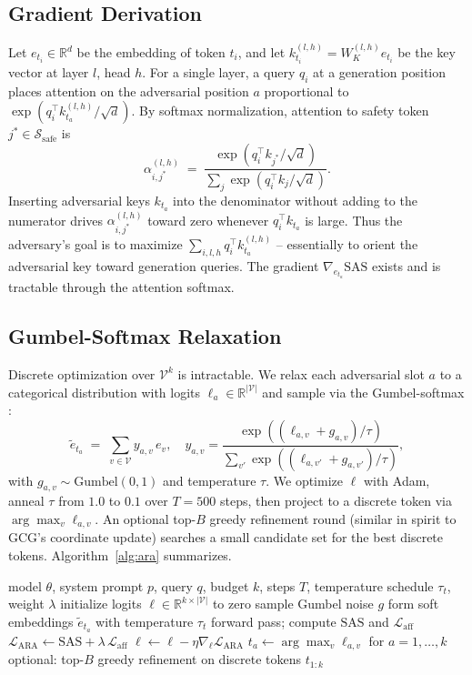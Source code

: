 \documentclass{article}
\theoremstyle{definition}
\theoremstyle{remark}
\newcommand{\SAS}{\mathrm{SAS}}
\newcommand{\R}{\mathbb{R}}
\begin{document}
\subsection{Gradient Derivation}

Let $e_{t_i} \in \R^d$ be the embedding of token $t_i$, and let $k^{(l,h)}_{t_i} = W_K^{(l,h)} e_{t_i}$ be the key vector at layer $l$, head $h$. For a single layer, a query $q_i$ at a generation position places attention on the adversarial position $a$ proportional to $\exp(q_i^\top k^{(l,h)}_{t_a}/\sqrt{d})$. By softmax normalization, attention to safety token $j^* \in \mathcal{S}_{\text{safe}}$ is
\[
\alpha^{(l,h)}_{i,j^*} \;=\; \frac{\exp(q_i^\top k_{j^*}/\sqrt{d})}{\sum_{j} \exp(q_i^\top k_j/\sqrt{d})}.
\]
Inserting adversarial keys $k_{t_a}$ into the denominator without adding to the numerator drives $\alpha^{(l,h)}_{i,j^*}$ toward zero whenever $q_i^\top k_{t_a}$ is large. Thus the adversary's goal is to maximize $\sum_{i,l,h} q_i^\top k^{(l,h)}_{t_a}$ -- essentially to orient the adversarial key toward generation queries. The gradient $\nabla_{e_{t_a}} \SAS$ exists and is tractable through the attention softmax.

\subsection{Gumbel-Softmax Relaxation}

Discrete optimization over $\mathcal{V}^k$ is intractable. We relax each adversarial slot $a$ to a categorical distribution with logits $\ell_a \in \R^{|\mathcal{V}|}$ and sample via the Gumbel-softmax \cite{jang2017gumbel,maddison2017concrete}:
\[
\tilde{e}_{t_a} \;=\; \sum_{v \in \mathcal{V}} y_{a,v} \, e_v, \quad y_{a,v} = \frac{\exp((\ell_{a,v}+g_{a,v})/\tau)}{\sum_{v'} \exp((\ell_{a,v'}+g_{a,v'})/\tau)},
\]
with $g_{a,v} \sim \mathrm{Gumbel}(0,1)$ and temperature $\tau$. We optimize $\ell$ with Adam, anneal $\tau$ from $1.0$ to $0.1$ over $T{=}500$ steps, then project to a discrete token via $\arg\max_v \ell_{a,v}$. An optional top-$B$ greedy refinement round (similar in spirit to GCG's coordinate update) searches a small candidate set for the best discrete tokens. Algorithm~\ref{alg:ara} summarizes.

\begin{algorithm}[t]
\caption{ARA attack construction}
\label{alg:ara}
\begin{algorithmic}[1]
\Require model $\theta$, system prompt $p$, query $q$, budget $k$, steps $T$, temperature schedule $\tau_t$, weight $\lambda$
\State initialize logits $\ell \in \R^{k \times |\mathcal{V}|}$ to zero
  \State sample Gumbel noise $g$
  \State form soft embeddings $\tilde{e}_{t_a}$ with temperature $\tau_t$
  \State forward pass; compute $\SAS$ and $\mathcal{L}_{\mathrm{aff}}$
  \State $\mathcal{L}_{\mathrm{ARA}} \gets \SAS + \lambda \, \mathcal{L}_{\mathrm{aff}}$
  \State $\ell \gets \ell - \eta \nabla_\ell \mathcal{L}_{\mathrm{ARA}}$
\EndFor
\State $t_a \gets \arg\max_v \ell_{a,v}$ for $a=1,\dots,k$
\State optional: top-$B$ greedy refinement on discrete tokens
\State \Return $t_{1:k}$
\end{algorithmic}
\end{algorithm}
\end{document}
